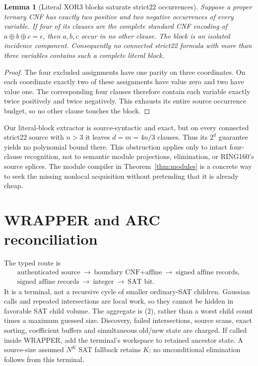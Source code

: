 \documentclass[11pt]{article}
\newtheorem{lemma}[theorem]{Lemma}
\begin{document}
\begin{lemma}[Literal XOR3 blocks saturate strict22 occurrences]
Suppose a proper ternary CNF has exactly two positive and two negative
occurrences of every variable. If four of its clauses are the complete
standard CNF encoding of $a\oplus b\oplus c=\epsilon$, then $a,b,c$ occur
in no other clause. The block is an isolated incidence component.
Consequently no connected strict22 formula with more than three variables
contains such a complete literal block.
\end{lemma}
\begin{proof}
The four excluded assignments have one parity on three coordinates.
On each coordinate exactly two of these assignments have value zero and two
have value one. The corresponding four clauses therefore contain each
variable exactly twice positively and twice negatively. This exhausts its
entire source occurrence budget, so no other clause touches the block.
\end{proof}
Our literal-block extractor is source-syntactic and exact, but on every
connected strict22 source with $n>3$ it leaves $d=m=4n/3$ clauses.
Thus its $2^d$ guarantee yields no polynomial bound there.
This obstruction applies only to intact four-clause recognition, not to
semantic module projections, elimination, or RING160's source splices.
The module compiler in Theorem~\ref{thm:modules} is a concrete way to seek
the missing nonlocal acquisition without pretending that it is already cheap.

\section{WRAPPER and ARC reconciliation}
The typed route is
\begin{gather*}
 \text{authenticated source}\ \longrightarrow\
 \text{boundary CNF+affine}\ \longrightarrow\
 \text{signed affine records},\\
 \text{signed affine records}\ \longrightarrow\
 \text{integer}\ \longrightarrow\ \text{SAT bit}.
\end{gather*}
It is a terminal, not a recursive cycle of smaller ordinary-SAT children.
Gaussian calls and repeated intersections are local work, so they cannot
be hidden in favorable SAT child volume. The aggregate is (2), rather than
a worst child count times a maximum guessed size. Discovery, failed
intersections, source scans, exact sorting, coefficient buffers and simultaneous
old/new state are charged. If called inside WRAPPER, add the terminal's
workspace to retained ancestor state. A source-size assumed $N^K$ SAT
fallback retains $K$; no unconditional elimination follows from this terminal.
\end{document}
